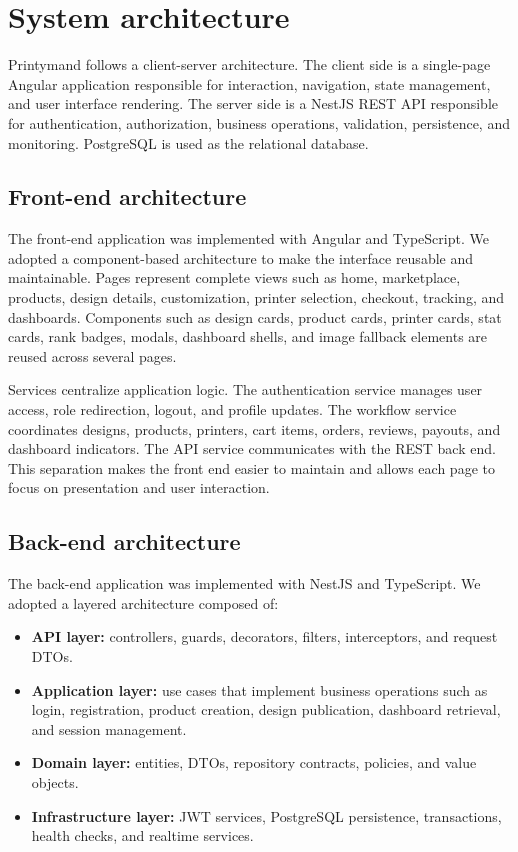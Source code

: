 \section{System architecture}
Printymand follows a client-server architecture.
The client side is a single-page Angular application responsible for interaction, navigation, state management, and user interface rendering. The server side is a NestJS REST API responsible for authentication, authorization, business operations, validation, persistence, and monitoring. PostgreSQL is used as the relational database.


\subsection{Front-end architecture}
The front-end application was implemented with Angular and TypeScript.
We adopted a component-based architecture to make the interface reusable and maintainable.
Pages represent complete views such as home, marketplace, products, design details, customization, printer selection, checkout, tracking, and dashboards.
Components such as design cards, product cards, printer cards, stat cards, rank badges, modals, dashboard shells, and image fallback elements are reused across several pages.

Services centralize application logic.
The authentication service manages user access, role redirection, logout, and profile updates.
The workflow service coordinates designs, products, printers, cart items, orders, reviews, payouts, and dashboard indicators.
The API service communicates with the REST back end.
This separation makes the front end easier to maintain and allows each page to focus on presentation and user interaction.

\subsection{Back-end architecture}
The back-end application was implemented with NestJS and TypeScript.
We adopted a layered architecture composed of:

\begin{itemize}
    \item \textbf{API layer:} controllers, guards, decorators, filters, interceptors, and request DTOs.
    \item \textbf{Application layer:} use cases that implement business operations such as login, registration, product creation, design publication, dashboard retrieval, and session management.
    \item \textbf{Domain layer:} entities, DTOs, repository contracts, policies, and value objects.
    \item \textbf{Infrastructure layer:} JWT services, PostgreSQL persistence, transactions, health checks, and realtime services.
\end{itemize}

